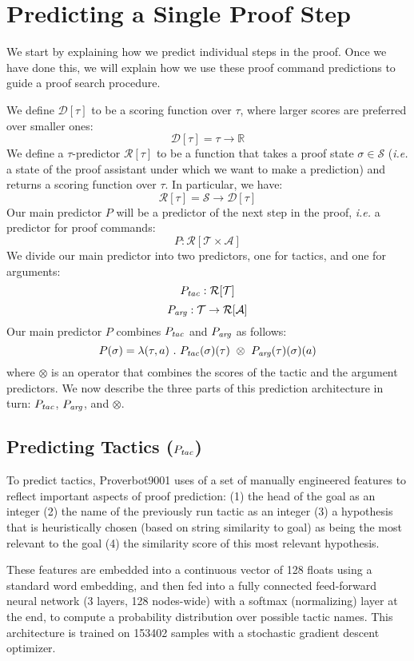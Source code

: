 \documentclass[sigplan,screen]{acmart}
\newcommand{\name}{Proverbot9001\xspace}
\newcommand{\States}{\mathcal{S}}
\newcommand{\Tactics}{\mathcal{T}}
\newcommand{\Reals}{\mathbb{R}}
\newcommand{\Args}{\mathcal{A}}
\newcommand{\PTac}{P_{\it tac}}
\newcommand{\PArg}{P_{\it arg}}
\newcommand{\PState}{P}
\newcommand{\st}{\sigma}
\newcommand{\tac}{\tau}
\newcommand{\argu}{a}
\newcommand{\Predictors}{\mathcal{R}}
\newcommand{\ScoringFuncs}{\mathcal{D}}
\newcommand{\Combine}{\otimes}
\renewcommand{\>}{\quad}
\begin{document}
\section{Predicting a Single Proof Step}
\label{sec:prediction}

We start by explaining how we predict individual steps in the proof.
Once we have done this, we will explain how we use these proof command predictions to guide a proof search procedure.

We define $\ScoringFuncs[\tac]$ to be a scoring function over $\tac$, where larger scores are preferred over smaller ones:
$$
\ScoringFuncs[\tac] = \tac \rightarrow \Reals
$$
We define a $\tac$-predictor $\Predictors[\tac]$ to be a function that takes a proof state $\st \in \States$ (\emph{i.e.} a state of the proof assistant under which we want to make a prediction) and returns a scoring function over $\tac$. In particular, we have:
$$\Predictors[\tac] = \States \rightarrow \ScoringFuncs[\tac]$$
Our main predictor $\PState$ will be a predictor of the next step in the proof, \emph{i.e.} a predictor for proof commands:
$$
\PState: \Predictors[\Tactics \times \Args]
$$
We divide our main predictor into two predictors, one for tactics, and one for arguments:
$$\PTac: \Predictors[\Tactics]$$
$$\PArg: \Tactics \rightarrow \Predictors[\Args]$$
Our main predictor $\PState$ combines $\PTac$ and $\PArg$ as follows:
$$
\PState(\st) = \lambda (\tac, \argu)~.~\PTac(\st)(\tac)~\Combine~\PArg(\tac)(\st)(\argu)
$$
where $\Combine$ is an operator that combines the scores of the tactic and the argument predictors.
We now describe the three parts of this prediction architecture in turn: $\PTac$, $\PArg$, and $\Combine$.

\subsection{Predicting Tactics ($\PTac$)}
\label{ssec:ptac}

To predict tactics,
  \name{} uses of a set of manually engineered features
  to reflect important aspects of proof prediction:
  (1) the head of the goal as an integer
  (2) the name of the previously run tactic as an integer
  (3) a hypothesis that is heuristically chosen (based on string similarity to goal)
      as being the most relevant to the goal
  (4) the similarity score of this most relevant hypothesis.

These features are embedded into a continuous vector of 128 floats
  using a standard word embedding,
  and then fed into a fully connected feed-forward neural network
  (3 layers, 128 nodes-wide) with a softmax (normalizing) layer at the end,
  to compute a probability distribution over possible tactic names.
This architecture is trained on 153402 samples
  with a stochastic gradient descent optimizer.
\end{document}
